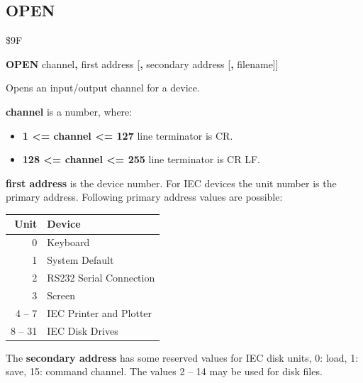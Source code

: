 
\newpage
\subsection{OPEN}
\begin{description}[leftmargin=2cm,style=nextline]
\item [Token:]    \$9F

\item [Format:]   {\bf OPEN} channel{\bf,} first address [{\bf,} secondary address [{\bf,} filename]]

\item [Usage:]    Opens an input/output channel for a device.

                  {\bf channel} is a number, where:
                  \begin{itemize}
                     \item {\bf 1 <= channel <= 127} line terminator is CR.
                     \item {\bf 128 <= channel <= 255} line terminator is CR LF.
                  \end{itemize}

                  {\bf first address} is the device number. For IEC devices the unit number is the primary address. Following primary address values are possible:

                  \begin{center}
                  {\setlength{\tabcolsep}{1mm}
                  \begin{tabular}{|r|l|}
                  \hline
                  {\bf Unit}  & {\bf Device} \\
                  \hline
                  0    & Keyboard \\
                  1    & System Default \\
                  2    & RS232 Serial Connection \\
                  3    & Screen \\
                  4 -- 7  & IEC Printer and Plotter \\
                  8 -- 31 & IEC Disk Drives \\
                  \hline
                  \end{tabular}
                  }
                  \end{center}

                  The {\bf secondary address} has some reserved values for IEC disk units, 0: load, 1: save, 15: command channel. The values 2 -- 14 may be used for disk files.


\end{description}
